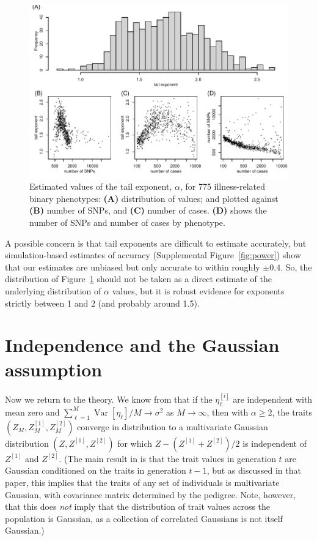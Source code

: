 \documentclass{article}
\newcommand{\var}{\mathop{\mbox{Var}}}
\newcommand{\1}{\mathbbm{1}}
\theoremstyle{remark}
\theoremstyle{definition}
\begin{document}
\begin{figure}
    \begin{center}
    \includegraphics{snp_effects/results_10}
    \end{center}
    \caption{
        Estimated values of the tail exponent, $\alpha$,
        for 775 illness-related binary phenotypes:
        \textbf{(A)} distribution of values; and plotted against
        \textbf{(B)} number of SNPs, and
        \textbf{(C)} number of cases.
        \textbf{(D)} shows the number of SNPs and number of cases by phenotype.
        \label{fig:exponent_hist}
    }
\end{figure}

A possible concern is that tail exponents are difficult to estimate accurately, 
but simulation-based estimates of accuracy (Supplemental Figure~\ref{fig:power})
show that our estimates are unbiased but only accurate to within roughly $\pm 0.4$.
So, the distribution of Figure~\ref{fig:exponent_hist} should not be taken as
a direct estimate of the underlying distribution of $\alpha$ values,
but it is robust evidence for exponents strictly between 1 and 2 (and probably around 1.5).

\section{Independence and the Gaussian assumption}

Now we return to the theory.
We know from \citet{barton2017infinitesimal}  
that if the $\eta^{[i]}_\ell$ are
independent with mean zero and $\sum_{\ell=1}^M \var[\eta_\ell]/M \to \sigma^2$ as $M \to \infty$,
then with $\alpha \ge 2$,
the traits $(Z_M, Z_M^{[1]}, Z_M^{[2]})$ converge in distribution to a multivariate Gaussian distribution
$(Z, Z^{[1]}, Z^{[2]})$ for which $Z - (Z^{[1]} + Z^{[2]})/2$ is independent of $Z^{[1]}$ and $Z^{[2]}$.
(The main result in \citet{barton2017infinitesimal} is that the trait values in generation $t$
are Gaussian conditioned on the traits in generation $t-1$,
but as discussed in that paper,
this implies that the traits of any set of individuals is multivariate Gaussian,
with covariance matrix determined by the pedigree.
Note, however, that this does \emph{not} imply that the distribution of trait values
across the population is Gaussian, as a collection of correlated Gaussians is not itself Gaussian.)
\end{document}
